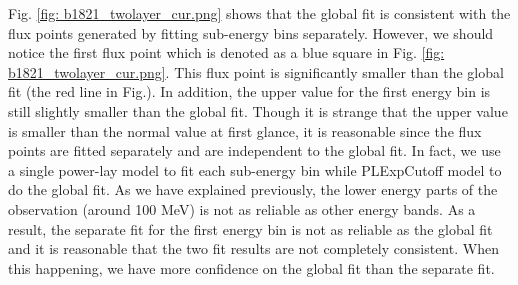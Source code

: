\documentclass[12pt]{report}
\begin{document}
            Fig. \ref{fig: b1821_twolayer_cur.png} shows that the global fit is consistent with 
            the flux points generated by fitting sub-energy bins separately. However, 
            we should notice the first flux point 
            which is denoted as a blue square in Fig. \ref{fig: b1821_twolayer_cur.png}. This 
            flux point is significantly smaller than the global fit (the red line in Fig.). 
            In addition, the upper value for the first energy bin is still slightly smaller than the global fit. 
            Though it is strange that the upper value is smaller than the normal value at first glance, 
            it is reasonable since the flux points are fitted separately and are independent to 
            the global fit. In fact, we use a single power-lay model to fit each sub-energy bin while PLExpCutoff
            model to do the global fit. As we have explained previously, the lower energy parts of the 
            observation (around 100 MeV) is not as reliable as other energy bands. As a result, the separate 
            fit for the first energy bin
            is not as reliable as the global fit and it is reasonable that the two fit results are not completely
            consistent. When this happening, we have more confidence on the global fit than the separate fit.
            
\end{document}
